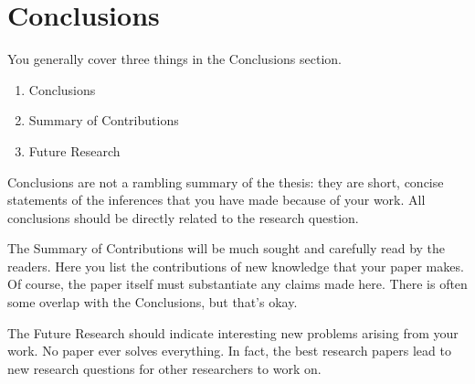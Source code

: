\documentclass[11pt]{article}       %
\begin{document}
\section{Conclusions} \label{concl}

You generally cover three things in the Conclusions section.
\begin{enumerate}
\item Conclusions
\item Summary of Contributions
\item Future Research
\end{enumerate}

Conclusions are not a rambling summary of the thesis: they are short, concise statements of the inferences that you have made because of your work. All conclusions should be directly related to the research question.

The Summary of Contributions will be much sought and carefully read by the readers. Here you list the contributions of new knowledge that your paper makes. Of course, the paper itself must substantiate any claims made here. There is often some overlap with the Conclusions, but that’s okay.

The Future Research should indicate interesting new problems arising from your work. No paper ever solves everything. In fact, the best research papers lead to new research questions for other researchers to work on.




\end{document}
